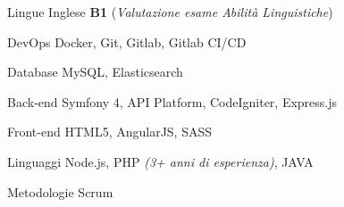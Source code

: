 

\begin{cvskills}

  \cvskill
    {Lingue} %
    {Inglese {\bf B1} ({\it Valutazione esame Abilità Linguistiche})} %

  \cvskill
    {DevOps} %
    {Docker, Git, Gitlab, Gitlab CI/CD} %

  \cvskill
    {Database} %
    {MySQL, Elasticsearch} %

  \cvskill
    {Back-end} %
    {Symfony 4, API Platform, CodeIgniter, Express.js} %

  \cvskill
    {Front-end} %
    {HTML5, AngularJS, SASS} %

  \cvskill
    {Linguaggi} %
    {Node.js, PHP {\it (3+ anni di esperienza)}, JAVA} %

  \cvskill
    {Metodologie} %
    {Scrum} %

\end{cvskills}
